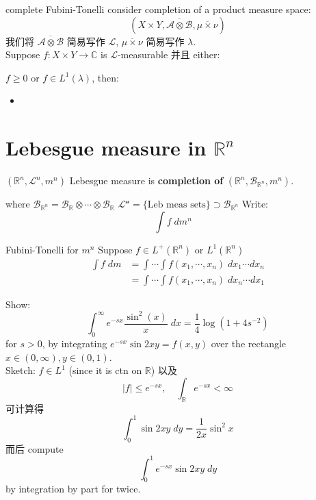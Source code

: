\documentclass[lang=cn,11pt]{elegantbook}
\begin{document}
\begin{theorem}{complete Fubini-Tonelli}
 consider completion of a product measure space: \[
(X \times Y , \overline{\mathcal{A} \otimes \mathcal{B}},  \overline{\mu \times \nu}   ) 
\]
我们将 $\overline{\mathcal{A} \otimes \mathcal{B}}$ 简易写作 $\mathcal{L}$, $\overline{\mu \times \nu}   $ 简易写作 $\lambda$.\\
Suppose $f: X \times Y \to \mathbb{C}$ is $\mathcal{L}$-measurable 并且 either: 

$f \geq 0$ or $f \in L^1(\lambda)$, then: 
\begin{itemize}
    \item 
\end{itemize}

    
\end{theorem}



\section{Lebesgue measure in $\mathbb{R}^n$}

\begin{definition}
    $(\mathbb{R}^n, \mathcal{L}^n, m^n)$ Lebesgue measure is \textbf{completion of } $(\mathbb{R}^n, \mathcal{B}_{\mathbb{R}^n}, m^n)$. 
\end{definition}
where $ \mathcal{B}_{\mathbb{R}^n} =  \mathcal{B}_{\mathbb{R}} \otimes \cdots \otimes \mathcal{B}_{\mathbb{R}}  $
\(\mathcal{L^n }  = \{ \text{Leb meas sets} \}  \supset  \mathcal{B}_{\mathbb{R}^n}\)
Write: \[  \int f \;d m^n   \quad 
\]


\begin{theorem}{Fubini-Tonelli for $m^n$}
    Suppose $f \in L^+(\mathbb{R}^n)$ or $L^1(\mathbb{R}^n)$
\begin{align}
\int f \; dm &= \int \cdots \int f(x_1, \cdots, x_n) 
\; dx_1 \cdots dx_n        \\
& = \int \cdots \int f(x_1, \cdots, x_n) 
\; dx_n \cdots dx_1
\end{align}
\end{theorem}

\begin{example}
    Show: \[
    \int_0^\infty e^{-sx} \frac{\sin^2(x)}{x} \; dx = \frac{1}{4} \log(1+ 4s^{-2})
    \]
for $s > 0$, by integrating $e^{-sx} \sin 2xy = f(x,y)$ over the rectangle $x \in (0,\infty), y \in (0,1)$.\\
Sketch: $f \in L^1$ (since it is ctn on $\mathbb{R}$)
以及 \[
|f| \leq e^{-sx}, \quad \int_{\mathbb{R}} e^{-sx} < \infty
\]
可计算得 \[
\int_0 ^1 \sin 2xy \; dy = \frac{1}{2x} \sin^2 x
\]
而后 compute \[
\int_0 ^1    e^{-sx} \sin 2xy \; dy
\] by integration by part for twice.
\end{example}
\end{document}
